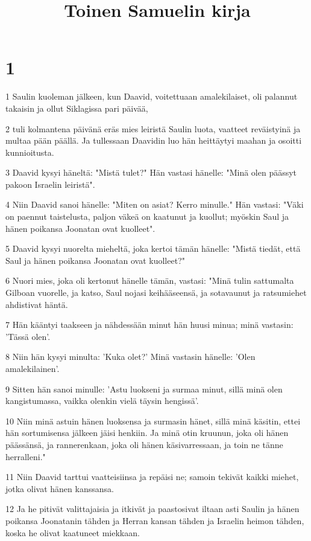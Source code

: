 

\title{Toinen Samuelin kirja}


\chapter{1}

\par 1 Saulin kuoleman jälkeen, kun Daavid, voitettuaan amalekilaiset, oli palannut takaisin ja ollut Siklagissa pari päivää,
\par 2 tuli kolmantena päivänä eräs mies leiristä Saulin luota, vaatteet reväistyinä ja multaa pään päällä. Ja tullessaan Daavidin luo hän heittäytyi maahan ja osoitti kunnioitusta.
\par 3 Daavid kysyi häneltä: "Mistä tulet?" Hän vastasi hänelle: "Minä olen päässyt pakoon Israelin leiristä".
\par 4 Niin Daavid sanoi hänelle: "Miten on asiat? Kerro minulle." Hän vastasi: "Väki on paennut taistelusta, paljon väkeä on kaatunut ja kuollut; myöskin Saul ja hänen poikansa Joonatan ovat kuolleet".
\par 5 Daavid kysyi nuorelta mieheltä, joka kertoi tämän hänelle: "Mistä tiedät, että Saul ja hänen poikansa Joonatan ovat kuolleet?"
\par 6 Nuori mies, joka oli kertonut hänelle tämän, vastasi: "Minä tulin sattumalta Gilboan vuorelle, ja katso, Saul nojasi keihääseensä, ja sotavaunut ja ratsumiehet ahdistivat häntä.
\par 7 Hän kääntyi taakseen ja nähdessään minut hän huusi minua; minä vastasin: 'Tässä olen'.
\par 8 Niin hän kysyi minulta: 'Kuka olet?' Minä vastasin hänelle: 'Olen amalekilainen'.
\par 9 Sitten hän sanoi minulle: 'Astu luokseni ja surmaa minut, sillä minä olen kangistumassa, vaikka olenkin vielä täysin hengissä'.
\par 10 Niin minä astuin hänen luoksensa ja surmasin hänet, sillä minä käsitin, ettei hän sortumisensa jälkeen jäisi henkiin. Ja minä otin kruunun, joka oli hänen päässänsä, ja rannerenkaan, joka oli hänen käsivarressaan, ja toin ne tänne herralleni."
\par 11 Niin Daavid tarttui vaatteisiinsa ja repäisi ne; samoin tekivät kaikki miehet, jotka olivat hänen kanssansa.
\par 12 Ja he pitivät valittajaisia ja itkivät ja paastosivat iltaan asti Saulin ja hänen poikansa Joonatanin tähden ja Herran kansan tähden ja Israelin heimon tähden, koska he olivat kaatuneet miekkaan.

